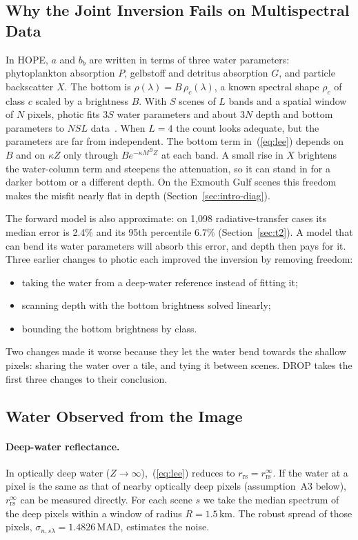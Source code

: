 \documentclass[remotesensing,article,submit,pdftex]{Definitions/mdpi}
\begin{document}
\subsection{Why the Joint Inversion Fails on Multispectral Data}\label{sec:why}

In HOPE, $a$ and $b_b$ are written in terms of three water parameters: phytoplankton absorption $P$, gelbstoff and detritus absorption $G$, and particle backscatter $X$. The bottom is $\rho(\lambda) = B\,\rho_c(\lambda)$, a known spectral shape $\rho_c$ of class $c$ scaled by a brightness $B$. With $S$ scenes of $L$ bands and a spatial window of $N$ pixels, photic fits $3S$ water parameters and about $3N$ depth and bottom parameters to $NSL$ data~\cite{blake2020}. When $L = 4$ the count looks adequate, but the parameters are far from independent. The bottom term in~(\ref{eq:lee}) depends on $B$ and on $\kappa Z$ only through $B e^{-\kappa M^B Z}$ at each band. A small rise in $X$ brightens the water-column term and steepens the attenuation, so it can stand in for a darker bottom or a different depth. On the Exmouth Gulf scenes this freedom makes the misfit nearly flat in depth (Section~\ref{sec:intro-diag}).

The forward model is also approximate: on 1,098 radiative-transfer cases its median error is 2.4\% and its 95th percentile 6.7\% (Section~\ref{sec:t2}). A model that can bend its water parameters will absorb this error, and depth then pays for it. Three earlier changes to photic each improved the inversion by removing freedom:
\begin{itemize}
\item taking the water from a deep-water reference instead of fitting it;
\item scanning depth with the bottom brightness solved linearly;
\item bounding the bottom brightness by class.
\end{itemize}
Two changes made it worse because they let the water bend towards the shallow pixels: sharing the water over a tile, and tying it between scenes. DROP takes the first three changes to their conclusion.

\subsection{Water Observed from the Image}\label{sec:water}

\paragraph{Deep-water reflectance.} In optically deep water ($Z \to \infty$),~(\ref{eq:lee}) reduces to $r_\mathrm{rs} = r_\mathrm{rs}^\infty$. If the water at a pixel is the same as that of nearby optically deep pixels (assumption~A3 below), $r_\mathrm{rs}^\infty$ can be measured directly. For each scene $s$ we take the median spectrum of the deep pixels within a window of radius $R = 1.5$\,km. The robust spread of those pixels, $\sigma_{n,s\lambda} = 1.4826\,\mathrm{MAD}$, estimates the noise.
\end{document}
